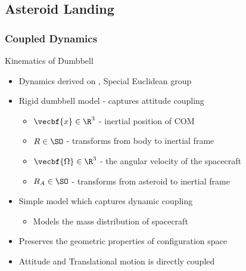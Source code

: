 
\subsection[Asteroid Landing]{Asteroid Landing}
\subsubsection[Coupled Dynamics]{Coupled Dynamics}

\begin{frame}{Kinematics of Dumbbell}
    \begin{itemize}
        \item Dynamics derived on \SE, Special Euclidean group
        \item Rigid dumbbell model - captures attitude coupling
        \pause
        \begin{itemize}
            \item \( \vecbf{x} \in \R^3 \) - inertial position of COM
            \item \( R \in \SO\) - transforms from body to inertial frame
            \item \( \vecbf{\Omega} \in \R^3 \) - the angular velocity of the spacecraft 
            \item \( R_A \in \SO \) - transforms from asteroid to inertial frame
        \end{itemize}    
        \pause
    \item Simple model which captures dynamic coupling  
        \begin{itemize}
            \item Models the mass distribution of spacecraft 
        \end{itemize}
        \pause
    \item Preserves the geometric properties of configuration space
    \item Attitude and Translational motion is directly coupled
\end{itemize}

\end{frame}

